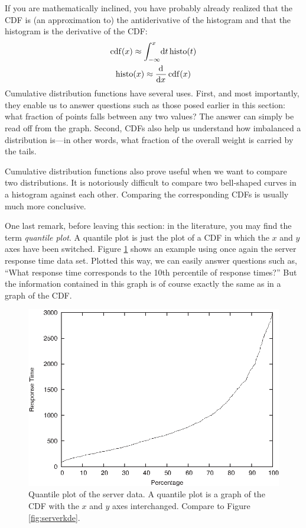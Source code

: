 If you are mathematically inclined, you have probably already realized
that the CDF is (an approximation to) the antiderivative of the
histogram and that the histogram is the derivative of the CDF:\vspace*{-3pt}
%
\begin{gather*}
\operatorname{cdf}(x) 
  \approx \int_{-\infty}^{x} \!\hbox{d}{t} \operatorname{histo}(t) \\
\operatorname{histo}(x) 
  \approx \mathop{}\!\frac{\hbox{d}^{} }{\hbox{d} x^{} } \operatorname{cdf}(x)
\end{gather*}
%
Cumulative distribution functions have several uses. First, and most
importantly, they enable us to answer questions such as those posed
earlier in this section: what fraction of points falls between any two
values? The answer can simply be read off from the graph. Second, CDFs
also help us understand how imbalanced a distribution is---in other
words, what fraction of the overall weight is carried by the tails.

Cumulative distribution functions also prove useful when we want to
compare two distributions. It is notoriously difficult to compare two
bell-shaped curves in a histogram against each other. Comparing the
corresponding CDFs is usually much more conclusive.

One last remark, before leaving this section: in the literature, you
may find the term \emph{quantile plot}.  A quantile plot is just the
plot of a CDF in which the $x$ and $y$ axes have been switched.
Figure \ref{fig:serverquantile} shows an example using once again the
server response time data set. Plotted this way, we can easily answer
questions such as, ``What response time corresponds to the 10th
percentile of response times?''  But the information contained in this
graph is of course exactly the same as in a graph of the CDF.

\begin{figure}
  \centerline{\includegraphics{img/serverquantile}}
  \caption{Quantile plot of the server data. A quantile plot is a
    graph of the CDF with the $x$ and $y$ axes interchanged. Compare
    to Figure \ref{fig:serverkde}.}
  \label{fig:serverquantile}
\end{figure}

